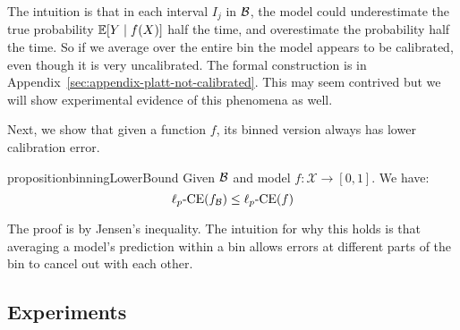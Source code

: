 The intuition is that in each interval $I_j$ in $\mathcal{B}{}$, the model could underestimate the true probability $\mathbb{E}[Y \mid f(X)]$ half the time, and overestimate the probability half the time. So if we average over the entire bin the model appears to be calibrated, even though it is very uncalibrated. The formal construction is in Appendix~\ref{sec:appendix-platt-not-calibrated}. This may seem contrived but we will show experimental evidence of this phenomena as well.

Next, we show that given a function $f$, its binned version always has lower calibration error.



\begin{restatable}{proposition}{binningLowerBound}
Given $\mathcal{B}{}$ and model $f : \mathcal{X} \to [0, 1]$. We have:
\[  \ell_p\mbox{-CE}(f_{\mathcal{B}{}}) \leq \ell_p\mbox{-CE}(f) \]
\end{restatable}

The proof is by Jensen's inequality. The intuition for why this holds is that averaging a model's prediction within a bin allows errors at different parts of the bin to cancel out with each other. 

\subsection{Experiments}

